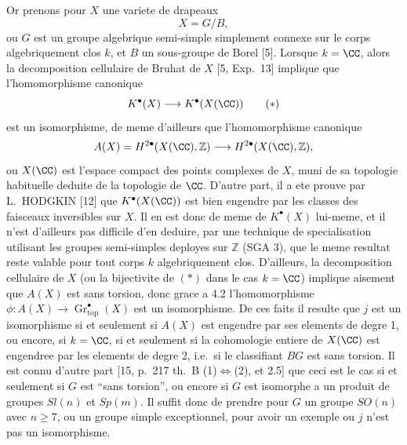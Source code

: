 Or prenons pour $X$ une variete de drapeaux
\[
X = G/B,
\]
ou $G$ est un groupe algebrique semi-simple simplement connexe sur le corps algebriquement clos $k$, et $B$ un sous-groupe de Borel [5]. Lorsque $k = \CC$, alors la decomposition cellulaire de Bruhat de $X$ [5, Exp.\ 13] implique que l'homomorphisme canonique
\[
K^{\bullet}(X) \longrightarrow K^{\bullet}(X(\CC)) \tag{$*$}
\]
est un isomorphisme, de meme d'ailleurs que l'homomorphisme canonique
\[
A(X) = H^{2\bullet}(X(\CC), \mathbb{Z}) \longrightarrow H^{2\bullet}(X(\CC), \mathbb{Z}),
\]
ou $X(\CC)$ est l'espace compact des points complexes de $X$, muni de sa topologie habituelle deduite de la topologie de $\CC$. D'autre part, il a ete prouve par L.\ HODGKIN [12] que $K^{\bullet}(X(\CC))$ est bien engendre par les classes des faisceaux inversibles sur $X$. Il en est donc de meme de $K^{\bullet}(X)$ lui-meme, et il n'est d'ailleurs pas difficile d'en deduire, par une technique de specialisation utilisant les groupes semi-simples deployes sur $\mathbb{Z}$ (SGA 3), que le meme resultat reste valable pour tout corps $k$ algebriquement clos. D'ailleurs, la decomposition cellulaire de $X$ (ou la bijectivite de $(*)$ dans le cas $k = \CC$) implique aisement que $A(X)$ est sans torsion, donc grace a 4.2 l'homomorphisme $\phi : A(X) \to \operatorname{Gr}_{\mathrm{top}}^{\bullet}(X)$ est un isomorphisme. De ces faits il resulte que $j$ est un isomorphisme si et seulement si $A(X)$ est engendre par ses elements de degre 1, ou encore, si $k = \CC$, si et seulement si la cohomologie entiere de $X(\CC)$ est engendree par les elements de degre 2, i.e.\ si le classifiant $BG$ est sans torsion. Il est connu d'autre part [15, p.\ 217 th.\ B (1)$\Leftrightarrow$(2), et 2.5] que ceci est le cas si et seulement si $G$ est ``sans torsion'', ou encore si $G$ est isomorphe a un produit de groupes $Sl(n)$ et $Sp(m)$. Il suffit donc de prendre pour $G$ un groupe $SO(n)$ avec $n \geq 7$, ou un groupe simple exceptionnel, pour avoir un exemple ou $j$ n'est pas un isomorphisme.

